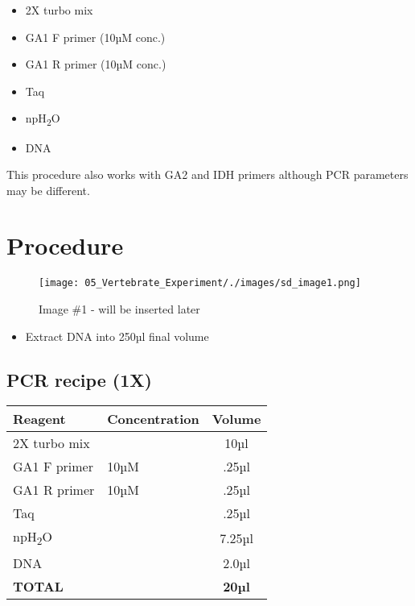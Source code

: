 \documentclass[
  letterpaper,
  DIV=11,
  numbers=noendperiod]{scrreprt}
\providecommand{\tightlist}{%
  \setlength{\itemsep}{0pt}\setlength{\parskip}{0pt}}\usepackage{longtable,booktabs,array}
\begin{document}
\begin{itemize}
\tightlist
\item
  2X turbo mix
\item
  GA1 F primer (10µM conc.)
\item
  GA1 R primer (10µM conc.)
\item
  Taq
\item
  npH\textsubscript{2}O
\item
  DNA
\end{itemize}

This procedure also works with GA2 and IDH primers although PCR
parameters may be different.

\hypertarget{procedure-78}{%
\section{Procedure}\label{procedure-78}}

\begin{figure}

{\centering \texttt{[image: 05\_Vertebrate\_Experiment/./images/sd\_image1.png]}

}

\caption{Image \#1 - will be inserted later}

\end{figure}

\begin{itemize}
\tightlist
\item
  Extract DNA into 250µl final volume
\end{itemize}

\hypertarget{pcr-recipe-1x}{%
\subsection{PCR recipe (1X)}\label{pcr-recipe-1x}}

\begin{longtable}[]{@{}llc@{}}
\toprule\noalign{}
Reagent & Concentration & Volume \\
\midrule\noalign{}
\endhead
\bottomrule\noalign{}
\endlastfoot
2X turbo mix & & 10µl \\
GA1 F primer & 10µM & .25µl \\
GA1 R primer & 10µM & .25µl \\
Taq & & .25µl \\
npH\textsubscript{2}O & & 7.25µl \\
DNA & & 2.0µl \\
\textbf{TOTAL} & & \textbf{20µl} \\
\end{longtable}
\end{document}
